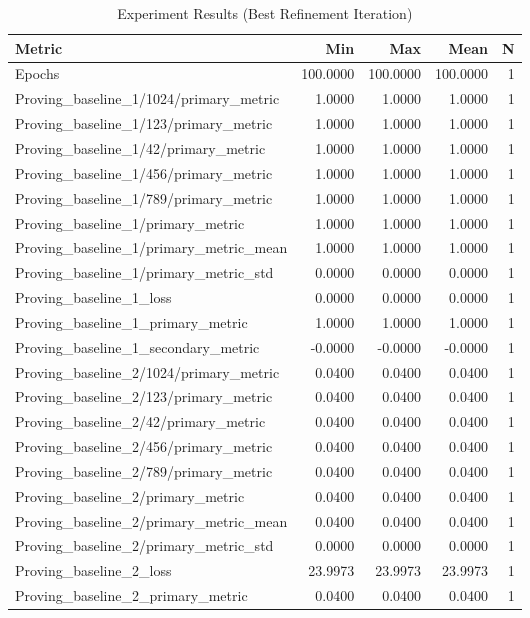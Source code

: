 \begin{table}[h]
\centering
\caption{Experiment Results (Best Refinement Iteration)}
\begin{tabular}{lrrrr}
\hline
Metric & Min & Max & Mean & N \\
\hline
Epochs & 100.0000 & 100.0000 & 100.0000 & 1 \\
Proving_baseline_1/1024/primary_metric & 1.0000 & 1.0000 & 1.0000 & 1 \\
Proving_baseline_1/123/primary_metric & 1.0000 & 1.0000 & 1.0000 & 1 \\
Proving_baseline_1/42/primary_metric & 1.0000 & 1.0000 & 1.0000 & 1 \\
Proving_baseline_1/456/primary_metric & 1.0000 & 1.0000 & 1.0000 & 1 \\
Proving_baseline_1/789/primary_metric & 1.0000 & 1.0000 & 1.0000 & 1 \\
Proving_baseline_1/primary_metric & 1.0000 & 1.0000 & 1.0000 & 1 \\
Proving_baseline_1/primary_metric_mean & 1.0000 & 1.0000 & 1.0000 & 1 \\
Proving_baseline_1/primary_metric_std & 0.0000 & 0.0000 & 0.0000 & 1 \\
Proving_baseline_1_loss & 0.0000 & 0.0000 & 0.0000 & 1 \\
Proving_baseline_1_primary_metric & 1.0000 & 1.0000 & 1.0000 & 1 \\
Proving_baseline_1_secondary_metric & -0.0000 & -0.0000 & -0.0000 & 1 \\
Proving_baseline_2/1024/primary_metric & 0.0400 & 0.0400 & 0.0400 & 1 \\
Proving_baseline_2/123/primary_metric & 0.0400 & 0.0400 & 0.0400 & 1 \\
Proving_baseline_2/42/primary_metric & 0.0400 & 0.0400 & 0.0400 & 1 \\
Proving_baseline_2/456/primary_metric & 0.0400 & 0.0400 & 0.0400 & 1 \\
Proving_baseline_2/789/primary_metric & 0.0400 & 0.0400 & 0.0400 & 1 \\
Proving_baseline_2/primary_metric & 0.0400 & 0.0400 & 0.0400 & 1 \\
Proving_baseline_2/primary_metric_mean & 0.0400 & 0.0400 & 0.0400 & 1 \\
Proving_baseline_2/primary_metric_std & 0.0000 & 0.0000 & 0.0000 & 1 \\
Proving_baseline_2_loss & 23.9973 & 23.9973 & 23.9973 & 1 \\
Proving_baseline_2_primary_metric & 0.0400 & 0.0400 & 0.0400 & 1 \\

\end{tabular}
\end{table}
